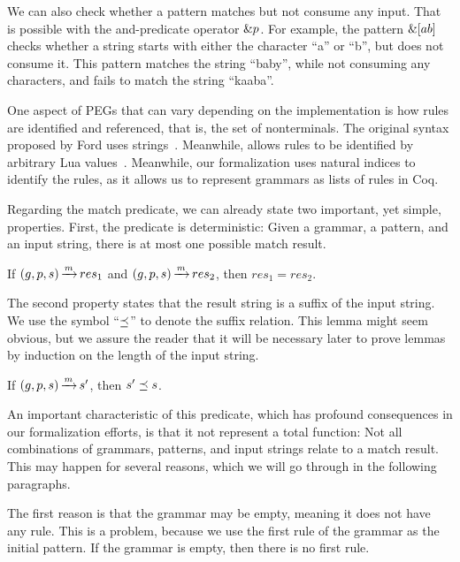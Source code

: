 We can also check whether a pattern matches
but not consume any input.
That is possible with the and-predicate operator $\&p$.
For example,
the pattern $\&[ab]$
checks whether a string
starts with either the character ``a'' or ``b'',
but does not consume it.
This pattern matches the string ``baby'',
while not consuming any characters,
and fails to match the string ``kaaba''.

One aspect of PEGs that can vary
depending on the implementation
is how rules are identified and referenced,
that is, the set of nonterminals.
The original syntax proposed by Ford
uses strings~\cite{ford_parsing_2004}.
Meanwhile,
\lpeg{} allows rules to be identified
by arbitrary Lua values~\cite{ierusalimschy_lpeg_2024}.
Meanwhile, our formalization uses natural indices
to identify the rules,
as it allows us to represent
grammars as lists of rules in Coq.

Regarding the match predicate,
we can already state two important,
yet simple, properties.
First, the predicate is deterministic:
Given a grammar, a pattern, and an input string,
there is at most one possible match result.

\begin{lemma}%
    If ${(g,p,s) \operatorname{\xrightarrow{\mathit{m}}} res_1}$
    and ${(g,p,s) \operatorname{\xrightarrow{\mathit{m}}} res_2}$,
    then ${res_1 = res_2}$.
    \label{lemma:match-determinism}
\end{lemma}

The second property states that the result string
is a suffix of the input string.
We use the symbol ``${\preceq}$''
to denote the suffix relation.
This lemma might seem obvious,
but we assure the reader that it will be necessary later
to prove lemmas by induction on the length of the input string.

\begin{lemma}%
    If ${(g,p,s) \operatorname{\xrightarrow{\mathit{m}}} s'}$,
    then ${s' \preceq s}$.
    \label{lemma:match-suffix}
\end{lemma}

An important characteristic of this predicate,
which has profound consequences in our formalization efforts,
is that it not represent a total function:
Not all combinations of
grammars, patterns, and input strings
relate to a match result.
This may happen for several reasons,
which we will go through
in the following paragraphs.

The first reason is that
the grammar may be empty,
meaning it does not have any rule.
This is a problem,
because we use the first rule of the grammar
as the initial pattern.
If the grammar is empty,
then there is no first rule.

